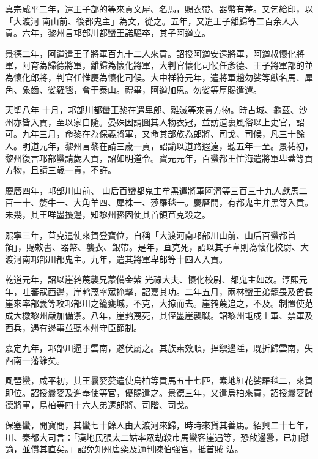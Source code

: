 \begin{pinyinscope}
 真宗咸平二年，遣王子部的等來貢文犀、名馬，賜衣帶、器幣有差。又乞給印，以「大渡河
 南山前、後都鬼主」為文，從之。五年，又遣王子離歸等二百余人入貢。六年，黎州言邛部川都蠻王諾驅卒，其子阿遒立。



 景德二年，阿遒遣王子將軍百九十二人來貢。詔授阿遒安遠將軍，阿遒叔懷化將軍，阿育為歸德將軍，離歸為懷化將軍，大判官懷化司候任彥德、王子將軍部的並為懷化郎將，判官任惟慶為懷化司候。大中祥符元年，遣將軍趙勿娑等獻名馬、犀角、象齒、娑羅毯，會于泰山。禮畢，阿遒加恩。勿娑等厚賜遣還。



 天聖八年
 十月，邛部川都蠻王黎在遣卑郎、離滅等來貢方物。時占城、龜茲、沙州亦皆入貢，至以家自隨。晏殊因請圖其人物衣冠，並訪道裏風俗以上史官，詔可。九年三月，命黎在為保義將軍，又命其部族為郎將、司戈、司候，凡三十餘人。明道元年，黎州言黎在請三歲一貢，詔諭以道路遐遠，聽五年一至。景祐初，黎州復言邛部蠻請歲入貢，詔如明道令。寶元元年，百蠻都王忙海遣將軍卑蓋等貢方物，且請三歲一貢，不許。



 慶曆四年，邛部川山前、
 山后百蠻都鬼主牟黑遣將軍阿濟等三百三十九人獻馬二百一十、嫠牛一、大角羊四、犀株一、莎羅毯一。慶曆間，有都鬼主弁黑等入貢。未幾，其王咩墨擾邊，知黎州孫固使其首領苴克殺之。



 熙寧三年，苴克遣使來賀登寶位，自稱「大渡河南邛部川山前、山后百蠻都首領」，賜敕書、器幣、襲衣、銀帶。是年，苴克死，詔以其子韋則為懷化校尉、大渡河南邛部川都鬼主。九年，遣其將軍卑郎等十四人入貢。



 乾道元年，詔以崖鹁蔑襲兄蒙備金紫
 光祿大夫、懷化校尉、都鬼主如故。淳熙元年，吐蕃寇西邊，崖鹁蔑率眾掩擊，詔嘉其功。二年五月，兩林蠻王弟籠畏及酋長崖來率部義等攻邛部川之籠甕城，不克，大掠而去。崖鹁蔑追之，不及。制置使范成大檄黎州嚴加備禦。八年，崖鹁蔑死，其侄墨崖襲職。詔黎州屯戍土軍、禁軍及西兵，遇有邊事並聽本州守臣節制。



 嘉定九年，邛部川逼于雲南，遂伏屬之。其族素效順，捍禦邊陲，既折歸雲南，失西南一藩籬矣。



 風琶蠻，咸平初，其王曩䓾䓾遣使烏柏等貢馬五十七匹，素地紅花娑羅毯二，來賀即位。詔授曩䓾及進奉使等官，優賜遣之。景德三年，又遣烏柏來貢，詔授曩䓾歸德將軍，烏柏等四十六人弟遷郎將、司階、司戈。



 保塞蠻，開寶間，其蠻七十餘人由大渡河來歸，時時來貨其善馬。紹興二十七年，川、秦都大司言：「漢地民張太二姑率眾劫殺市馬蠻客崖遇等，恐啟邊釁，已加慰諭，並償其直矣。」詔免知州唐栾及通判陳伯強官，抵首賊
 法。




\end{pinyinscope}
